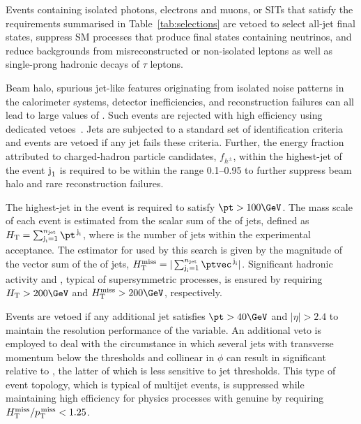 Events containing isolated photons, electrons and muons, or SITs that
satisfy the requirements summarised in Table~\ref{tab:selections} are
vetoed to select all-jet final states, suppress SM processes that
produce final states containing neutrinos, and reduce backgrounds from
misreconstructed or non-isolated leptons as well as single-prong
hadronic decays of $\tau$ leptons.

Beam halo, spurious jet-like features originating from isolated noise
patterns in the calorimeter systems, detector inefficiencies, and
reconstruction failures can all lead to large values of \ptmiss. Such
events are rejected with high efficiency using dedicated
vetoes~\cite{CMS-PAS-JME-16-004, Khachatryan:2014gga}. Jets are
subjected to a standard set of identification
criteria~\cite{2011JInst611002C} and events are vetoed if any jet
fails these criteria. Further, the energy fraction attributed to
charged-hadron particle candidates, $f_{h^{\pm}}$, within the
highest-\pt jet of the event $\text{j}_\text{1}$ is required to be within the
range 0.1--0.95 to further suppress beam halo and rare reconstruction
failures. 

The highest-\pt jet in the event is required to satisfy $\pt >
100\GeV$. The mass scale of each event is estimated from the scalar
sum of the \pt of jets, defined as $\scalht = \sum_{\jet{i} =
  1}^{\njet} \pt^{\,\jet{i}}$, where \njet is the number of jets
within the experimental acceptance. The estimator for \ptvecmiss used
by this search is given by the magnitude of the vector sum of the \pt
of jets, $\mht = |\sum_{\jet{i} = 1}^{\njet}
\ptvec^{\,\jet{i}}|$. Significant hadronic activity and \ptvecmiss,
typical of supersymmetric processes, is ensured by requiring $\scalht
> 200\GeV$ and $\mht > 200\GeV$, respectively.

Events are vetoed if any additional jet satisfies $\pt > 40\GeV$ and
$|\eta| > 2.4$ to maintain the resolution performance of the \mht
variable. An additional veto is employed to deal with the circumstance
in which several jets with transverse momentum below the \pt
thresholds and collinear in $\phi$ can result in significant \mht
relative to \ptmiss, the latter of which is less sensitive to jet
thresholds. This type of event topology, which is typical of multijet
events, is suppressed while maintaining high efficiency for physics
processes with genuine \ptvecmiss by requiring $H_{\text{T}}^{\text{miss}} / p_{\text{T}}^{\kern1pt\text{miss}} < 1.25$.



